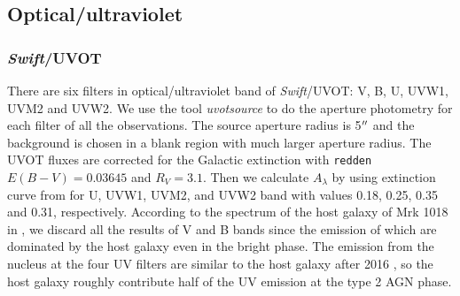 \documentclass[twocolumn]{aastex63}
\newcommand{\swift}{{\small \it Swift}}
\newcommand{\uvot}{{\small {\it Swift}/UVOT}}
\begin{document}
\subsection{Optical/ultraviolet}
\subsubsection{\swift/UVOT}
\label{sec:uvot}
There are six filters in optical/ultraviolet band of \uvot: V, B, U, UVW1, UVM2 and UVW2. We use the tool \textit{uvotsource} to do the aperture photometry for each filter of all the observations. The source aperture radius is 5$\mbox{$^{\prime\prime}$}$ and the background is chosen in a blank region with much larger aperture radius. The UVOT fluxes are corrected for the Galactic extinction with \texttt{redden} $E(B-V) = 0.03645$ \citep[see ][]{2018MNRAS.480.3898N} and $R_{V}=3.1$. Then we calculate  $A_{\lambda}$ by using extinction curve from \citet{2007ApJ...663..320F} for U, UVW1, UVM2, and 
UVW2 band with values 0.18, 0.25, 0.35 and 0.31, respectively. According to the spectrum of the host galaxy of Mrk 1018 in \citep{2018MNRAS.480.3898N}, we discard all the results of V and B bands since the emission of which are dominated by the host galaxy even in the bright phase. The emission from the nucleus at the four UV filters are similar to the host galaxy after 2016 \citep[see][]{2018MNRAS.480.3898N}, so the host galaxy roughly contribute half of the UV emission at the type 2 AGN phase. 





\end{document}
